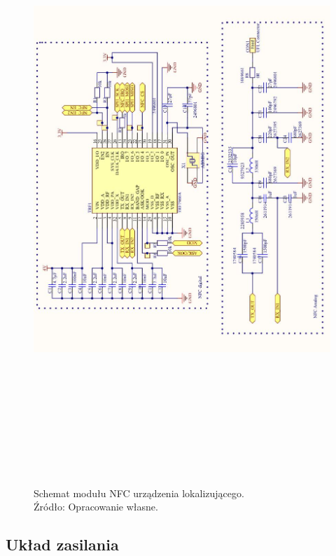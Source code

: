 \begin{figure}[H]
	\centering
	\includegraphics[width=16cm, height=23cm]{img/schematics/mainboard_NFC.jpg}
	\caption{Schemat modułu NFC urządzenia lokalizującego. \\ Źródło: Opracowanie własne.}
	\label{fig:image_mainboard_NFC_schematic}
\end{figure}



\subsection{Układ zasilania}

